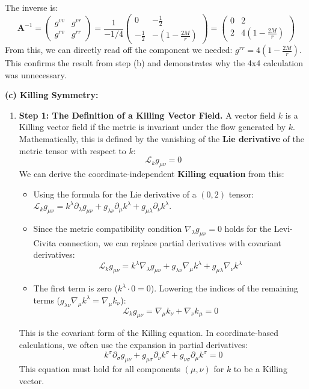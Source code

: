 \begin{solution}
The inverse is:
\[
\mathbf{A}^{-1} = 
\begin{pmatrix}
g^{vv} & g^{vr} \\
g^{rv} & g^{rr}
\end{pmatrix}
= \frac{1}{-1/4}
\begin{pmatrix}
0 & -\frac{1}{2} \\
-\frac{1}{2} & -(1 - \frac{2M}{r})
\end{pmatrix}
=
\begin{pmatrix}
0 & 2 \\
2 & 4(1 - \frac{2M}{r})
\end{pmatrix}
\]
From this, we can directly read off the component we needed: $g^{rr} = 4(1 - \frac{2M}{r})$. This confirms the result from step (b) and demonstrates why the 4x4 calculation was unnecessary.

\textbf{(c) Killing Symmetry:}
\begin{enumerate}
    \item \textbf{Step 1: The Definition of a Killing Vector Field.}
    A vector field $k$ is a Killing vector field if the metric is invariant under the flow generated by $k$. Mathematically, this is defined by the vanishing of the \textbf{Lie derivative} of the metric tensor with respect to $k$:
    \[ \mathcal{L}_k g_{\mu\nu} = 0 \]
    We can derive the coordinate-independent \textbf{Killing equation} from this:
    \begin{itemize}
        \item Using the formula for the Lie derivative of a $(0,2)$ tensor: $\mathcal{L}_k g_{\mu\nu} = k^\lambda \partial_\lambda g_{\mu\nu} + g_{\lambda\nu} \partial_\mu k^\lambda + g_{\mu\lambda} \partial_\nu k^\lambda$.
        \item Since the metric compatibility condition $\nabla_\lambda g_{\mu\nu} = 0$ holds for the Levi-Civita connection, we can replace partial derivatives with covariant derivatives:
        \[ \mathcal{L}_k g_{\mu\nu} = k^\lambda \nabla_\lambda g_{\mu\nu} + g_{\lambda\nu} \nabla_\mu k^\lambda + g_{\mu\lambda} \nabla_\nu k^\lambda \]
        \item The first term is zero ($k^\lambda \cdot 0 = 0$). Lowering the indices of the remaining terms ($g_{\lambda\nu} \nabla_\mu k^\lambda = \nabla_\mu k_\nu$):
        \[ \mathcal{L}_k g_{\mu\nu} = \nabla_\mu k_\nu + \nabla_\nu k_\mu = 0 \]
    \end{itemize}
    This is the covariant form of the Killing equation. In coordinate-based calculations, we often use the expansion in partial derivatives:
    \[ k^\sigma \partial_\sigma g_{\mu\nu} + g_{\mu\sigma} \partial_\nu k^\sigma + g_{\nu\sigma} \partial_\mu k^\sigma = 0 \]
    This equation must hold for all components $(\mu, \nu)$ for $k$ to be a Killing vector.


\end{enumerate}
\end{solution}
